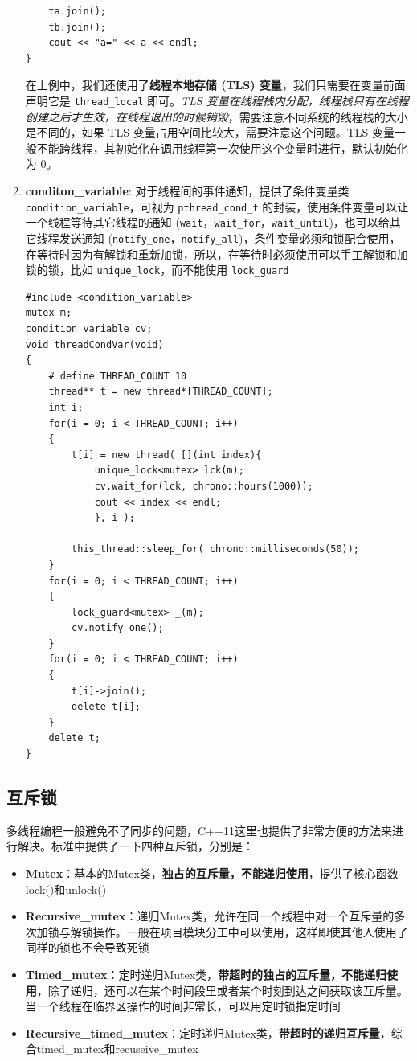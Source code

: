 \documentclass[UTF8,a4paper,12pt]{ctexbook}
\begin{document}
\begin{enumerate}[itemindent = 1em]
\begin{lstlisting}
	ta.join();
	tb.join();
	cout << "a=" << a << endl;
}
			\end{lstlisting}
			
			在上例中，我们还使用了\textbf{线程本地存储 (TLS) 变量}，我们只需要在变量前面声明它是 \verb|thread_local| 即可。\textit{TLS 变量在线程栈内分配，线程栈只有在线程创建之后才生效，在线程退出的时候销毁}，需要注意不同系统的线程栈的大小是不同的，如果 TLS 变量占用空间比较大，需要注意这个问题。TLS 变量一般不能跨线程，其初始化在调用线程第一次使用这个变量时进行，默认初始化为 0。
			
			\item \textbf{conditon\_variable}: 对于线程间的事件通知，提供了条件变量类 \verb|condition_variable|，可视为 \verb|pthread_cond_t| 的封装，使用条件变量可以让一个线程等待其它线程的通知 (\verb|wait|，\verb|wait_for|，\verb|wait_until|)，也可以给其它线程发送通知 (\verb|notify_one|，\verb|notify_all|)，条件变量必须和锁配合使用，在等待时因为有解锁和重新加锁，所以，在等待时必须使用可以手工解锁和加锁的锁，比如 \verb|unique_lock|，而不能使用 \verb|lock_guard|
			
			\begin{lstlisting}
#include <condition_variable>
mutex m;
condition_variable cv;
void threadCondVar(void)
{
	# define THREAD_COUNT 10
	thread** t = new thread*[THREAD_COUNT];
	int i;
	for(i = 0; i < THREAD_COUNT; i++)
	{
		t[i] = new thread( [](int index){
			unique_lock<mutex> lck(m);
			cv.wait_for(lck, chrono::hours(1000));
			cout << index << endl;
			}, i );
			
		this_thread::sleep_for( chrono::milliseconds(50));
	}
	for(i = 0; i < THREAD_COUNT; i++)
	{
		lock_guard<mutex> _(m);
		cv.notify_one();
	}
	for(i = 0; i < THREAD_COUNT; i++)
	{
		t[i]->join();
		delete t[i];
	}
	delete t;
}
			\end{lstlisting}
		\end{enumerate}
	\subsection{互斥锁}
		多线程编程一般避免不了同步的问题，C++11这里也提供了非常方便的方法来进行解决。标准中提供了一下四种互斥锁，分别是：
		\begin{itemize}
			\item  \textbf{Mutex}：基本的Mutex类，\textbf{独占的互斥量，不能递归使用}，提供了核心函数lock()和unlock()
			\item  \textbf{Recursive\_mutex}：递归Mutex类，允许在同一个线程中对一个互斥量的多次加锁与解锁操作。一般在项目模块分工中可以使用，这样即使其他人使用了同样的锁也不会导致死锁
			\item \textbf{Timed\_mutex}：定时递归Mutex类，\textbf{带超时的独占的互斥量，不能递归使用}，除了递归，还可以在某个时间段里或者某个时刻到达之间获取该互斥量。当一个线程在临界区操作的时间非常长，可以用定时锁指定时间
			\item \textbf{Recursive\_timed\_mutex}：定时递归Mutex类，\textbf{带超时的递归互斥量}，综合timed\_mutex和recuseive\_mutex
		\end{itemize}
		
\end{document}
